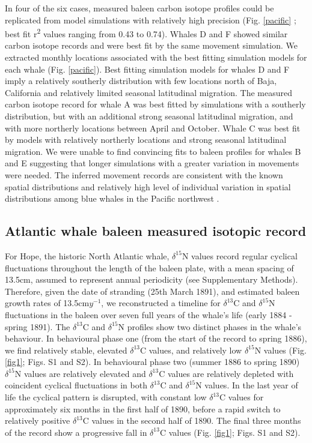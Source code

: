 \documentclass[a4paper,12pt]{article}
\begin{document}
In four of the six cases, measured baleen carbon isotope profiles could be replicated from model simulations with relatively high precision (Fig. \ref{pacific}
; best fit r\textsuperscript{2} values ranging from 0.43 to 0.74).
Whales D and F showed similar carbon isotope records and were best fit by the same movement simulation. 
We extracted monthly locations associated with the best fitting simulation models for each whale (Fig. \ref{pacific}).
Best fitting simulation models for whales D and F imply a relatively southerly distribution with few locations north of Baja, California and relatively limited seasonal latitudinal migration. 
The measured carbon isotope record for whale A was best fitted by simulations with a southerly distribution, but with an additional strong seasonal latitudinal migration, and with more northerly locations between April and October. 
Whale C was best fit by models with relatively northerly locations and strong seasonal latitudinal migration. 
We were unable to find convincing fits to baleen profiles for whales B and E suggesting that longer simulations with a greater variation in movements were needed. 
The inferred movement records are consistent with the known spatial distributions and relatively high level of individual variation in spatial distributions among blue whales in the Pacific northwest \cite{irvine2017quantifying, mate2007evolution}.

\subsection{Atlantic whale baleen measured isotopic record}

For Hope, the historic North Atlantic whale, \(\delta^{15}\)N values record regular cyclical fluctuations throughout the length of the baleen plate, with a mean spacing of 13.5cm, assumed to represent annual periodicity (see Supplementary Methods). 
Therefore, given the date of stranding (25th March 1891), and estimated baleen growth rates of 13.5cm\(y^{- 1}\), we reconstructed a timeline for \(\delta^{13}\)C and \(\delta^{15}\)N fluctuations in the baleen over seven full years of the whale's life (early 1884 - spring 1891). 
The \(\delta^{13}\)C and \(\delta^{15}\)N profiles show two distinct phases in the whale's behaviour. 
In behavioural phase one (from the start of the record to spring 1886), we find relatively stable, elevated \(\delta^{13}\)C values, and relatively low \(\delta^{15}\)N values (Fig. \ref{fig1}; Figs. S1 and S2). 
In behavioural phase two (summer 1886 to spring 1890) \(\delta^{15}\)N values are relatively elevated and \(\delta^{13}\)C values are relatively depleted with coincident cyclical fluctuations in both \(\delta^{13}\)C and \(\delta^{15}\)N values. 
In the last year of life the cyclical pattern is disrupted, with constant low \(\delta^{13}\)C values for approximately six months in the first half of 1890, before a rapid switch to relatively positive \(\delta^{13}\)C values in the second half of 1890. 
The final three months of the record show a progressive fall in \(\delta^{13}\)C values (Fig. \ref{fig1}; Figs. S1 and S2).
\end{document}
